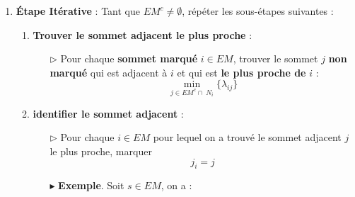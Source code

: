 \documentclass{report}
\begin{document}
\begin{multicols*}{2}
\begin{enumerate}
    \item \textbf{Étape Itérative} : Tant que \( EM^c \neq \emptyset \), répéter les sous-étapes suivantes :

        \begin{enumerate}
            \item \textbf{Trouver le sommet adjacent le plus proche} :
                \begin{itemize}
                    \item[\( \rhd \)] Pour chaque \textbf{sommet  marqué}  \( i \in EM \), 
                         trouver le sommet $j$ \textbf{non marqué} qui est adjacent à 
                         $i$ et qui est \textbf{le plus proche de } $i$  :
                        \[
                            \min_{j \in EM^c \cap \; N_i}\bigl\{\lambda_{ij} \bigr\}
                        \]
                \end{itemize}

            \item \textbf{identifier le sommet adjacent} :
                \begin{itemize}
                    \item[\( \rhd \)] 
                        Pour chaque $i \in EM$ pour lequel on a trouvé le 
                        sommet adjacent $j$ le plus proche, 
                        marquer 
                        \[
                            \boxed{j_i = j}
                        \]
\begin{center}
\end{center}
    \item [$\blacktriangleright$ ] \textbf{Exemple}. Soit $s \in EM$, on a :


\end{itemize}
\end{enumerate}
\end{enumerate}
\end{multicols*}
\end{document}
